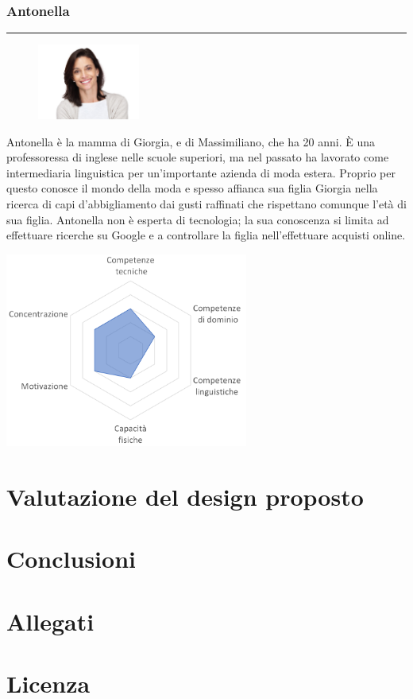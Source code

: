 \documentclass[12pt,a4paper]{report}
\begin{document}
\subsection*{Antonella}
\rule{\textwidth}{0.5pt}
\begin{figure}
  \centering
    \includegraphics[width=0.3\textwidth]{"Images Latex/Personas/Antonella"}
\end{figure}
Antonella è la mamma di Giorgia, e di Massimiliano, che ha 20 anni. È una professoressa di inglese nelle scuole superiori, ma nel passato ha lavorato come intermediaria linguistica per un'importante azienda di moda estera. Proprio per questo conosce il mondo della moda e spesso affianca sua figlia Giorgia nella ricerca di capi d'abbigliamento dai gusti raffinati che rispettano comunque l'età di sua figlia. Antonella non è esperta di tecnologia; la sua conoscenza si limita ad effettuare ricerche su Google e a controllare la figlia nell'effettuare acquisti online.
\begin{center}
  \includegraphics[width=0.6\textwidth]{"Images Latex/Personas/Antonella45"}
\end{center}
\chapter{Valutazione del design proposto}
\chapter{Conclusioni}
\chapter{Allegati}
\chapter{Licenza}
\end{document}
